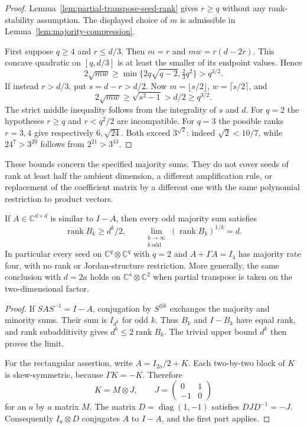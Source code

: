 \begin{proof}
Lemma~\ref{lem:partial-transpose-seed-rank} gives $r\ge q$ without
any rank-stability assumption. The displayed choice of $m$ is
admissible in Lemma~\ref{lem:majority-compression}.

First suppose $q\ge4$ and $r\le d/3$. Then $m=r$ and
$mw=r(d-2r)$. This concave quadratic on $[q,d/3]$ is at least
the smaller of its endpoint values. Hence
\[
 2\sqrt{mw}\ge
 \min\{2q\sqrt{q-2},\tfrac23q^2\}>q^{3/2}.
\]
If instead $r>d/3$, put $s=d-r>d/2$. Now
$m=\lfloor s/2\rfloor$, $w=\lceil s/2\rceil$, and
\[
 2\sqrt{mw}\ge\sqrt{s^2-1}>d/2\ge q^{3/2}.
\]
The strict middle inequality follows from the integrality of $s$
and $d$. For $q=2$ the hypotheses $r\ge q$ and $r<q^2/2$ are
incompatible. For $q=3$ the possible ranks $r=3,4$ give respectively
$6,\sqrt{24}$. Both exceed
$3^{\sqrt2}$: indeed $\sqrt2<10/7$, while
$24^7>3^{20}$ follows from $2^{21}>3^{13}$.
\end{proof}

These bounds concern the specified majority sums. They do not cover
seeds of rank at least half the ambient dimension, a different
amplification rule, or replacement of the coefficient matrix by a
different one with the same polynomial restriction to product vectors.

\begin{proposition}
\label{prop:majority-similar-seed}
If $A\in\mathbb C^{d\times d}$ is similar to $I-A$, then every odd
majority sum satisfies
\[
 \operatorname{rank}B_k\ge d^k/2,
 \qquad
 \lim_{\substack{k\to\infty\\k\ \text{odd}}}
       (\operatorname{rank}B_k)^{1/k}=d.
\]
In particular every seed on $\mathbb C^q\otimes\mathbb C^q$ with
$q=2$ and $A+\Gamma A=I_4$ has majority rate four, with no rank or
Jordan-structure restriction. More generally, the same conclusion
with $d=2a$ holds on $\mathbb C^a\otimes\mathbb C^2$ when partial
transpose is taken on the two-dimensional factor.
\end{proposition}

\begin{proof}
If $SAS^{-1}=I-A$, conjugation by $S^{\otimes k}$ exchanges the
majority and minority sums. Their sum is $I_{d^k}$ for odd $k$.
Thus $B_k$ and $I-B_k$ have equal rank, and rank subadditivity gives
$d^k\le2\operatorname{rank}B_k$. The trivial upper bound $d^k$
then proves the limit.

For the rectangular assertion, write $A=I_{2a}/2+K$.
Each two-by-two block of $K$ is skew-symmetric, because
$\Gamma K=-K$. Therefore
\[
 K=M\otimes J,\qquad
 J=\begin{pmatrix}0&1\\-1&0\end{pmatrix}
\]
for an $a$ by $a$ matrix $M$. The matrix
$D=\operatorname{diag}(1,-1)$ satisfies $DJD^{-1}=-J$.
Consequently $I_a\otimes D$ conjugates $A$ to $I-A$, and the
first part applies.
\end{proof}


